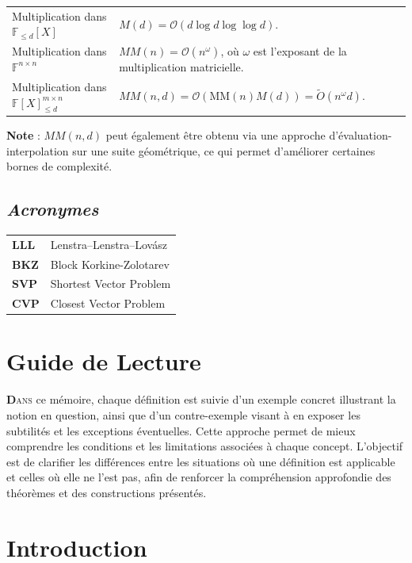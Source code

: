 \documentclass[a4paper,12pt]{report}  %
\theoremstyle{definitionstyle}
\theoremstyle{examplestyle}
\theoremstyle{remarkstyle}
\theoremstyle{propositionstyle}
\theoremstyle{theoremstyle}
\theoremstyle{proofstyle}
\begin{document}
\begin{tabular}{@{}p{5cm}p{12cm}@{}}
	Multiplication dans $\mathbb{F}_{\leq d}[X]$ & $M(d) = \mathcal{O}(d \log d \log \log d)$.\\
	Multiplication dans $\mathbb{F}^{n\times n}$ & $MM(n) = \mathcal{O}(n^\omega)$, où $\omega$ est l'exposant de la multiplication matricielle.\\
	Multiplication dans $\mathbb{F}[X]_{\leq d}^{m\times n}$ & $MM(n,d) = \mathcal{O}(\text{MM}(n) M(d)) = \tilde{O}(n^\omega d)$.\\
\end{tabular}

\textbf{Note} : $MM(n,d)$ peut également être obtenu via une approche d'évaluation-interpolation sur une suite géométrique, ce qui permet d'améliorer certaines bornes de complexité.



	\section*{\textit{Acronymes}}
	
	\begin{tabular}{@{}p{3cm}p{10cm}@{}}
		\textbf{LLL} & Lenstra–Lenstra–Lovász\\
		\textbf{BKZ} & Block Korkine-Zolotarev\\
		\textbf{SVP} & Shortest Vector Problem\\
		\textbf{CVP} & Closest Vector Problem
	\end{tabular}

	\chapter*{Guide de Lecture}
	
		\lettrine{\textbf{D}}{ans} ce mémoire, chaque définition est suivie d'un exemple concret illustrant la notion en question, ainsi que d'un contre-exemple visant à en exposer les subtilités et les exceptions éventuelles. Cette approche permet de mieux comprendre les conditions et les limitations associées à chaque concept. L'objectif est de clarifier les différences entre les situations où une définition est applicable et celles où elle ne l'est pas, afin de renforcer la compréhension approfondie des théorèmes et des constructions présentés.
		
	\chapter*{Introduction}
	
\end{document}
